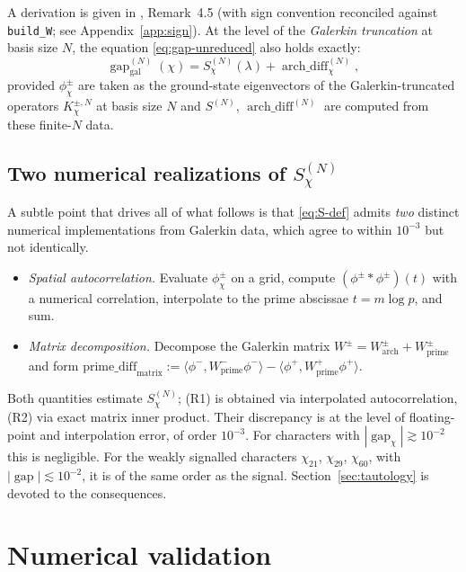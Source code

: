 \documentclass[a4paper,10pt,twocolumn]{article}
\theoremstyle{definition}
\theoremstyle{remark}
\newcommand{\gap}{\operatorname{gap}}
\newcommand{\chifn}{\chi}
\newcommand{\archdiff}{\operatorname{arch\_diff}}
\begin{document}
A derivation is given in \cite{AnalyticKernel}, Remark~4.5 (with
sign convention reconciled against \texttt{build\_W}; see
Appendix~\ref{app:sign}). At the level of the \emph{Galerkin
truncation} at basis size $N$, the equation
\eqref{eq:gap-unreduced} also holds exactly:
\begin{equation}
\label{eq:gap-galerkin}
  \gap_{\mathrm{gal}}^{(N)}(\chifn)
    = S_{\chifn}^{(N)}(\lambda) + \archdiff_{\chifn}^{(N)},
\end{equation}
provided $\phi^\pm_{\chifn}$ are taken as the ground-state
eigenvectors of the Galerkin-truncated operators $K_{\chifn}^{\pm,
N}$ at basis size $N$ and $S^{(N)}$, $\archdiff^{(N)}$ are computed
from these finite-$N$ data.

\subsection{Two numerical realizations of \texorpdfstring{$S_{\chifn}^{(N)}$}{S}}
\label{sec:formula-two-realizations}

A subtle point that drives all of what follows is that
\eqref{eq:S-def} admits \emph{two} distinct numerical
implementations from Galerkin data, which agree to within $10^{-3}$
but not identically.
\begin{itemize}
  \item[(R1)] \emph{Spatial autocorrelation.} Evaluate
    $\phi_{\chifn}^\pm$ on a grid, compute $(\phi^\pm
    *\phi^\pm)(t)$ with a numerical correlation, interpolate to
    the prime abscissae $t=m\log p$, and sum.
  \item[(R2)] \emph{Matrix decomposition.} Decompose the Galerkin
    matrix $W^\pm=W^\pm_{\mathrm{arch}}+W^\pm_{\mathrm{prime}}$ and
    form
    $\mathrm{prime\_diff}_{\mathrm{matrix}}
      :=\langle\phi^-,W^-_{\mathrm{prime}}\phi^-\rangle
      -\langle\phi^+,W^+_{\mathrm{prime}}\phi^+\rangle$.
\end{itemize}
Both quantities estimate $S_{\chifn}^{(N)}$; (R1) is obtained via
interpolated autocorrelation, (R2) via exact matrix inner product.
Their discrepancy is at the level of floating-point and
interpolation error, of order $10^{-3}$. For characters with
$|\gap_{\chifn}|\gtrsim 10^{-2}$ this is negligible. For the weakly
signalled characters $\chifn_{21}$, $\chifn_{29}$, $\chifn_{60}$,
with $|\gap|\lesssim 10^{-2}$, it is of the same order as the
signal. Section~\ref{sec:tautology} is devoted to the consequences.

\section{Numerical validation}
\label{sec:validation}
\end{document}
